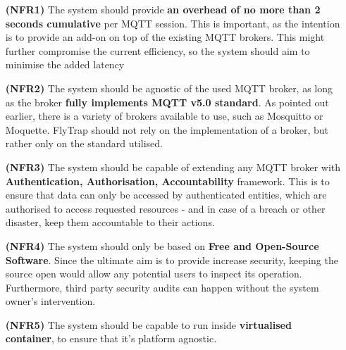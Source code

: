 \begin{itemize}[leftmargin=4.5em]
\item[\textbf{(NFR1)}] The system should provide \textbf{an overhead of no more than 2 seconds cumulative} per MQTT session. This is important, as the intention is to provide an add-on on top of the existing MQTT brokers. This might further compromise the current efficiency, so the system should aim to minimise the added latency 
\item[\textbf{(NFR2)}] The system should be agnostic of the used MQTT broker, as long as the broker \textbf{fully implements MQTT v5.0 standard}. As pointed out earlier, there is a variety of brokers available to use, such as Mosquitto or Moquette. FlyTrap should not rely on the implementation of a broker, but rather only on the standard utilised.
\item[\textbf{(NFR3)}] The system should be capable of extending any MQTT broker with \textbf{Authentication, Authorisation, Accountability} framework. This is to ensure that data can only be accessed by authenticated entities, which are authorised to access requested resources - and in case of a breach or other disaster, keep them accountable to their actions.
\item[\textbf{(NFR4)}] The system should only be based on \textbf{Free and Open-Source Software}. Since the ultimate aim is to provide increase security, keeping the source open would allow any potential users to inspect its operation. Furthermore, third party security audits can happen without the system owner's intervention.
\item[\textbf{(NFR5)}] The system should be capable to run inside \textbf{virtualised container}, to ensure that it's platform agnostic.
\end{itemize}
